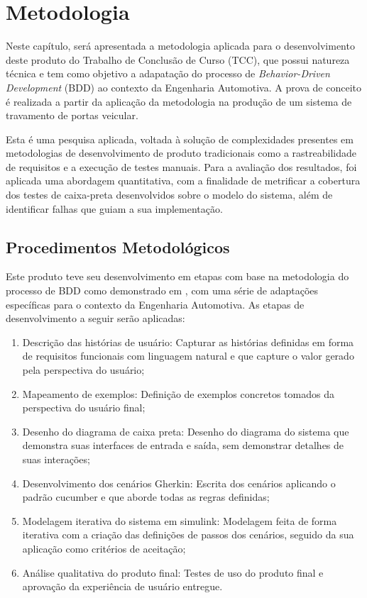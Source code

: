 \chapter{Metodologia} \label{ch:MM} %
Neste capítulo, será apresentada a metodologia aplicada para o desenvolvimento deste produto do Trabalho de Conclusão de Curso (TCC), que possui natureza técnica 
e tem como objetivo a adapatação do processo de \textit{Behavior-Driven Development} (BDD) ao contexto da Engenharia Automotiva. A prova de conceito é realizada a 
partir da aplicação da metodologia na produção de um sistema de travamento de portas veicular. 

Esta é uma pesquisa aplicada, voltada à solução de complexidades presentes em metodologias de desenvolvimento de produto tradicionais como a rastreabilidade de 
requisitos e a execução de testes manuais. Para a avaliação dos resultados, foi aplicada uma abordagem quantitativa, com a finalidade de metrificar a cobertura 
dos testes de caixa-preta desenvolvidos sobre o modelo do sistema, além de identificar falhas que guiam a sua implementação. 

\section{\textbf{Procedimentos Metodológicos}}
Este produto teve seu desenvolvimento em etapas com base na metodologia do processo de BDD como demonstrado em , com uma série de adaptações específicas 
para o contexto da Engenharia Automotiva. As etapas de desenvolvimento a seguir serão aplicadas:
\begin{enumerate}
    \item Descrição das histórias de usuário: Capturar as histórias definidas em forma de requisitos funcionais com linguagem natural e que capture o valor 
    gerado pela perspectiva do usuário;
    \item Mapeamento de exemplos: Definição de exemplos concretos tomados da perspectiva do usuário final;
    \item Desenho do diagrama de caixa preta: Desenho do diagrama do sistema que demonstra suas interfaces de entrada e saída, sem demonstrar detalhes de suas interações;
    \item Desenvolvimento dos cenários Gherkin: Escrita dos cenários aplicando o padrão cucumber e que aborde todas as regras definidas;
    \item Modelagem iterativa do sistema em simulink: Modelagem feita de forma iterativa com a criação das definições de passos dos cenários, seguido da sua aplicação como critérios de aceitação;
    \item Análise qualitativa do produto final: Testes de uso do produto final e aprovação da experiência de usuário entregue.
\end{enumerate}

